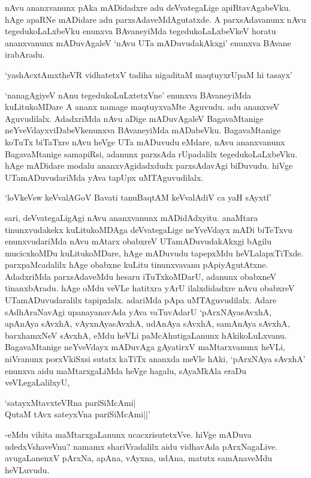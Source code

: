 nAvu ananxvanunx pAka mADidadxre adu deVvategaLige apiRtavAgabeVku. hAge apaRNe mADidare adu parxsAdaveMdAgutatxde. A parxsAdavanunx nAvu tegedukoLaLxbeVku enunxva BAvaneyiMda tegedukoLaLxbeVkeV horatu ananxvanunx mADuvAgaleV `nAvu UTa mADuvudakAkxgi' enunxva BAvane irabAradu.

\begin{shloka}
`yashAcxtAmxtheVR vidhatetxV tadiha nigaditaM maqtuyxrUpaM hi tasayx'
\end{shloka}

`nanagAgiyeV nAnu tegedukoLuLxtetxVne' enunxva BAvaneyiMda kuLitukoMDare A ananx namage maqtuyxvaMte Aguvudu. adu ananxveV Aguvudilalx. AdadxriMda nAvu aDige mADuvAgaleV BagavaMtanige neYveVdayxviDabeVkenunxva BAvaneyiMda mADabeVku. BagavaMtanige koTuTx biTaTxre nAvu heVge UTa mADuvudu eMdare, nAvu ananxvanunx BagavaMtanige samapiRsi, adanunx parxsAda rUpadalilx tegedukoLaLxbeVku. hAge mADidare modalu ananxvAgidadxdudx parxsAdavAgi biDuvudu. hiVge UTamADuvudariMda yAva tapUpx uMTAguvudilalx.

\begin{shloka}
`loVkeV\s sw keVvalAGoV Bavati tanuBaqtAM keVvalAdiV ca yaH sAyxtf'
\end{shloka}

sari, deVvategaLigAgi nAvu ananxvanunx mADidAdxyitu. anaMtara tinunxvudakekx kuLitukoMDAga deVvategaLige neYveVdayx mADi biTeTxvu enunxvudariMda nAvu mAtarx obabxreV UTamADuvudakAkxgi bAgilu mucicxkoMDu kuLitukoMDare, hAge mADuvudu tapepxMdu heVLalapxTiTxde. parxpaMcadalilx hAge obabxne kuLitu tinunxvavanu pApiyAgutAtxne. AdadxriMda parxsAdaveMdu hesaru iTuTxkoMDarU, adanunx obabxneV tinanxbAradu. hAge oMdu veVLe hatitxra yArU ilalxdidadxre nAvu obabxreV UTamADuvudaralilx tapipxlalx. adariMda pApa uMTAguvudilalx. Adare sAdhAraNavAgi upanayanavAda yAva vaTuvAdarU `pArxNAyasAvxhA, apAnAya sAvxhA, vAyxnAyasAvxhA, udAnAya sAvxhA, samAnAya sAvxhA, barxhamxNeV sAvxhA, eMdu heVLi paMcAhutigaLanunx hAkikoLuLxvanu. BagavaMtanige neYveVdayx mADuvAga gAyatirxV maMtarxvanunx heVLi, niVranunx porxVkiSxsi sutatx kaTiTx ananxda meVle hAki, `pArxNAya sAvxhA' enunxva aidu maMtarxgaLiMda heVge hagalu, sAyaMkAla eraDu veVLegaLalilxyU,

\begin{shloka}
`satayxMtavxteVRna pariSiMcAmi|\\
QutaM tAvx sateyxVna pariSiMcAmi||'
\end{shloka}

-eMdu vihita maMtarxgaLanunx ucacxrisutetxVve. hiVge mADuva udedxVshaveVnu? namamx shariVradalilx aidu vidhavAda pArxNagaLive. avugaLanenxV pArxNa, apAna, vAyxna, udAna, matutx samAnaveMdu heVLuvudu.

